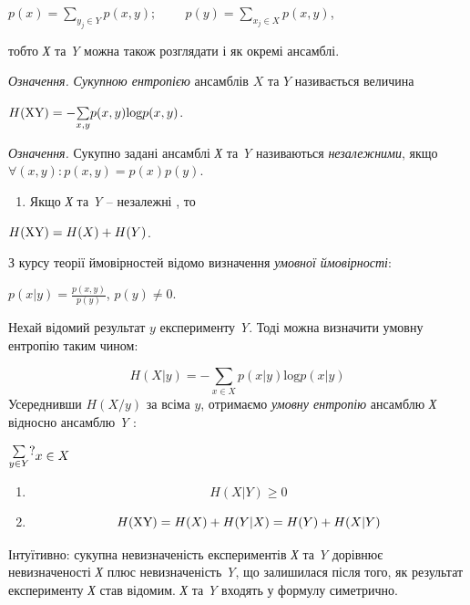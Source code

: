 \documentclass[a4paper]{article}
\newcounter{saveenum}
\newcommand\liststyleWWviiiNumxxxix{%
\renewcommand\theenumi{\arabic{enumi}}
\renewcommand\theenumii{\arabic{enumii}}
\renewcommand\theenumiii{\arabic{enumiii}}
\renewcommand\theenumiv{\arabic{enumiv}}
\renewcommand\labelenumi{\theenumi)}
\renewcommand\labelenumii{\theenumii.}
\renewcommand\labelenumiii{\theenumiii.}
\renewcommand\labelenumiv{\theenumiv.}
}
\newcounter{}
\newcommand\normalsubformula[1]{\text{\mathversion{normal}$#1$}}
\begin{document}
{\centering
 ${p(x)=\underset{{y_{{j}}\in Y}}{\sum
}{p(x,y)};\;\;\;\;\;\;\;\;p(y)=\underset{x_{{j}}\in X}{\sum }{p(x,y)}}$,
\par}

тобто \textit{Х} та \textit{Y} можна також розглядати і як окремі ансамблі.

\textit{Означення.} \textit{Сукупною ентропією} ансамблів  ${X}$ та  ${Y}$
називається величина

{\centering
 ${H(\normalsubformula{\text{XY}})=-\underset{{x,y}}{\sum
}{p(x,y)\text{log}p(x,y)}}$.
\par}

\textit{Означення.} Сукупно задані ансамблі \textit{Х} та \textit{Y} називаються
\textit{незалежними}, якщо  ${\forall (x,y):p(x,y)=p(x)p(y)}$.

\liststyleWWviiiNumxxxix
\setcounter{saveenum}{\value{enumi}}
\begin{enumerate}
\setcounter{enumi}{\value{saveenum}}
\item Якщо \textit{Х} та \textit{Y} – незалежні , то
\end{enumerate}
{\centering
 ${H(\normalsubformula{\text{XY}})=H(X)+H(Y)}$.
\par}

З курсу теорії ймовірностей відомо визначення \textit{умовної ймовірності}:

{\centering
 ${p\left(x|y\right)=\frac{p(x,y)}{p(y)}}$,   ${p(y)\neq 0}$.
\par}

Нехай відомий результат  ${y}$ експерименту \textit{Y}. Тоді можна визначити
умовну ентропію таким чином:

\begin{equation*}
{H\left(X|y\right)=-\underset{{x\in X}}{\sum
}{p\left(x|y\right)\text{log}p\left(x|y\right)}}
\end{equation*}
Усереднивши  ${H(X/y)}$ за всіма  ${y}$, отримаємо \textit{умовну ентропію}
ансамблю  \textit{Х } відносно ансамблю \textit{Y} :

 $\begin{matrix}\underset{{y\in Y}}{\sum }?\hfill\null \end{matrix}{x\in
X}\hfill $

\liststyleWWviiiNumxxxix
\setcounter{saveenum}{\value{enumi}}
\begin{enumerate}
\setcounter{enumi}{\value{saveenum}}
\item \begin{equation*}
{H(X|Y)\ge 0}
\end{equation*}
\item \begin{equation*}
{H(\normalsubformula{\text{XY}})=H(X)+H(Y|X)=H(Y)+H(X|Y)}
\end{equation*}
\end{enumerate}
Інтуїтивно: сукупна невизначеність експериментів \textit{Х} та \textit{Y}
дорівнює невизначеності \textit{Х} плюс невизначеність \textit{Y}, що
залишилася після того, як результат експерименту \textit{Х} став відомим.
\textit{Х} та \textit{Y} входять у формулу симетрично.
\end{document}
